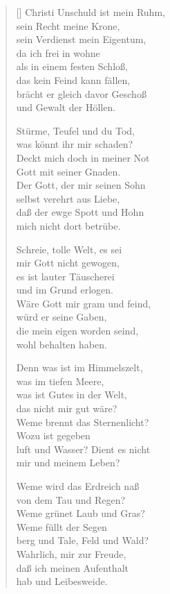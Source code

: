 \begin{multicols}{2}
\begin{verse}[\versewidth]
 Christi Unschuld ist mein Ruhm,\\
sein Recht meine Krone,\\
sein Verdienst mein Eigentum,\\
da ich frei in wohne\\
als in einem festen Schloß,\\
das kein Feind kann fällen,\\
brächt er gleich davor Geschoß\\
und Gewalt der Höllen.

 Stürme, Teufel und du Tod,\\
was könnt ihr mir schaden?\\
Deckt mich doch in meiner Not\\
Gott mit seiner Gnaden.\\
Der Gott, der mir seinen Sohn\\
selbst verehrt aus Liebe,\\
daß der ewge Spott und Hohn\\
mich nicht dort betrübe.

 Schreie, tolle Welt, es sei\\
mir Gott nicht gewogen,\\
es ist lauter Täuscherei\\
und im Grund erlogen.\\
Wäre Gott mir gram und feind,\\
würd er seine Gaben,\\
die mein eigen worden seind,\\
wohl behalten haben.

 Denn was ist im Himmelszelt,\\
was im tiefen Meere,\\
was ist Gutes in der Welt,\\
das nicht mir gut wäre?\\
Weme brennt das Sternenlicht?\\
Wozu ist gegeben\\
luft und Wasser? Dient es nicht\\
mir und meinem Leben?

 Weme wird das Erdreich naß\\
von dem Tau und Regen?\\
Weme grünet Laub und Gras?\\
Weme füllt der Segen\\
berg und Tale, Feld und Wald?\\
Wahrlich, mir zur Freude,\\
daß ich meinen Aufenthalt\\
hab und Leibesweide.


\end{verse}
\end{multicols}
